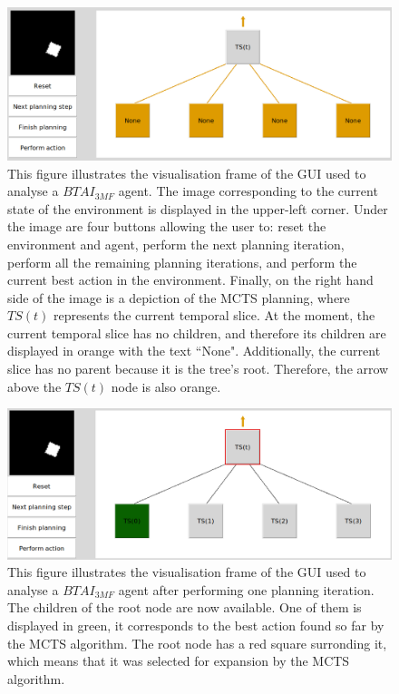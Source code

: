 \documentclass[twoside,11pt]{article}
\begin{document}
\begin{figure}[H]
	\begin{center}
	\includegraphics[scale=0.4]{visualisation_frame}
	\end{center}
  \caption{This figure illustrates the visualisation frame of the GUI used to analyse a $BTAI_{3MF}$ agent. The image corresponding to the current state of the environment is displayed in the upper-left corner. Under the image are four buttons allowing the user to: reset the environment and agent, perform the next planning iteration, perform all the remaining planning iterations, and perform the current best action in the environment. Finally, on the right hand side of the image is a depiction of the MCTS planning, where $TS(t)$ represents the current temporal slice. At the moment, the current temporal slice has no children, and therefore its children are displayed in orange with the text ``None". Additionally, the current slice has no parent because it is the tree's root. Therefore, the arrow above the $TS(t)$ node is also orange.}
   \label{fig:gui_vf}
\end{figure}

\begin{figure}[H]
	\begin{center}
	\includegraphics[scale=0.4]{vf_next_planning_step}
	\end{center}
  \caption{This figure illustrates the visualisation frame of the GUI used to analyse a $BTAI_{3MF}$ agent after performing one planning iteration. The children of the root node are now available. One of them is displayed in green, it corresponds to the best action found so far by the MCTS algorithm. The root node has a red square surronding it, which means that it was selected for expansion by the MCTS algorithm.}
   \label{fig:gui_vf_next_planning_step}
\end{figure}
\end{document}
